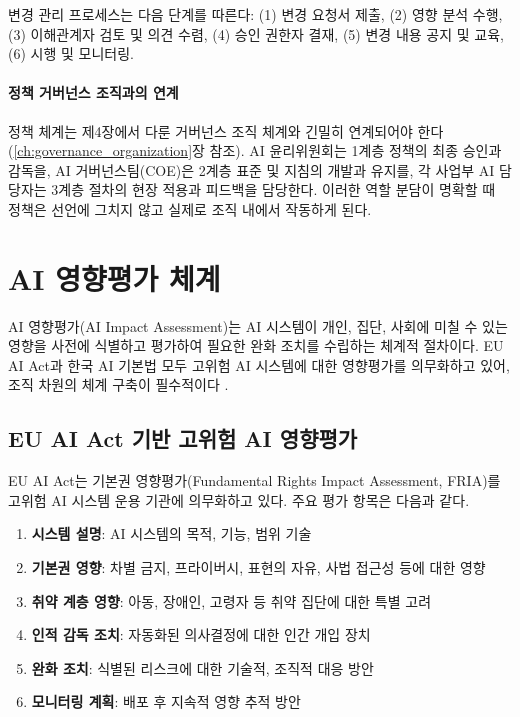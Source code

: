 변경 관리 프로세스는 다음 단계를 따른다: (1) 변경 요청서 제출, (2) 영향 분석 수행, (3) 이해관계자 검토 및 의견 수렴, (4) 승인 권한자 결재, (5) 변경 내용 공지 및 교육, (6) 시행 및 모니터링.

\paragraph{정책 거버넌스 조직과의 연계}
정책 체계는 제4장에서 다룬 거버넌스 조직 체계와 긴밀히 연계되어야 한다(\ref{ch:governance_organization}장 참조). AI 윤리위원회는 1계층 정책의 최종 승인과 감독을, AI 거버넌스팀(COE)은 2계층 표준 및 지침의 개발과 유지를, 각 사업부 AI 담당자는 3계층 절차의 현장 적용과 피드백을 담당한다. 이러한 역할 분담이 명확할 때 정책은 선언에 그치지 않고 실제로 조직 내에서 작동하게 된다.

\section{AI 영향평가 체계}
\label{sec:5.2}

AI 영향평가(AI Impact Assessment)는 AI 시스템이 개인, 집단, 사회에 미칠 수 있는 영향을 사전에 식별하고 평가하여 필요한 완화 조치를 수립하는 체계적 절차이다. EU AI Act과 한국 AI 기본법 모두 고위험 AI 시스템에 대한 영향평가를 의무화하고 있어, 조직 차원의 체계 구축이 필수적이다 \cite{eu2024aiact}.

\subsection{EU AI Act 기반 고위험 AI 영향평가}
\label{sec:5.2.1}

EU AI Act는 기본권 영향평가(Fundamental Rights Impact Assessment, FRIA)를 고위험 AI 시스템 운용 기관에 의무화하고 있다. 주요 평가 항목은 다음과 같다.

\begin{enumerate}
 \item \textbf{시스템 설명}: AI 시스템의 목적, 기능, 범위 기술
 \item \textbf{기본권 영향}: 차별 금지, 프라이버시, 표현의 자유, 사법 접근성 등에 대한 영향
 \item \textbf{취약 계층 영향}: 아동, 장애인, 고령자 등 취약 집단에 대한 특별 고려
 \item \textbf{인적 감독 조치}: 자동화된 의사결정에 대한 인간 개입 장치
 \item \textbf{완화 조치}: 식별된 리스크에 대한 기술적, 조직적 대응 방안
 \item \textbf{모니터링 계획}: 배포 후 지속적 영향 추적 방안
\end{enumerate}


